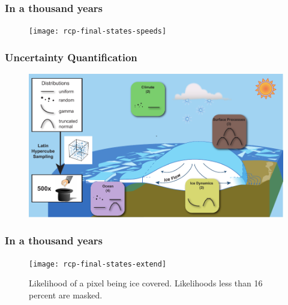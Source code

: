 \documentclass[hide notes,intlimits]{beamer}
\begin{document}
\begin{frame}
  \frametitle{In a thousand years}
  \begin{figure}
    \texttt{[image: rcp-final-states-speeds]}
  \end{figure}
\end{frame}


\begin{frame}
  \frametitle{Uncertainty Quantification}
    \begin{figure}
    \includegraphics[width=\textwidth]{uncertainty-quantification}
    \end{figure}
\end{frame}

\begin{frame}
  \frametitle{In a thousand years}
  \begin{figure}
    \texttt{[image: rcp-final-states-extend]}
  \caption{Likelihood of a pixel being ice covered. Likelihoods less than 16 percent are masked.}
  \end{figure}
\end{frame}
\end{document}
